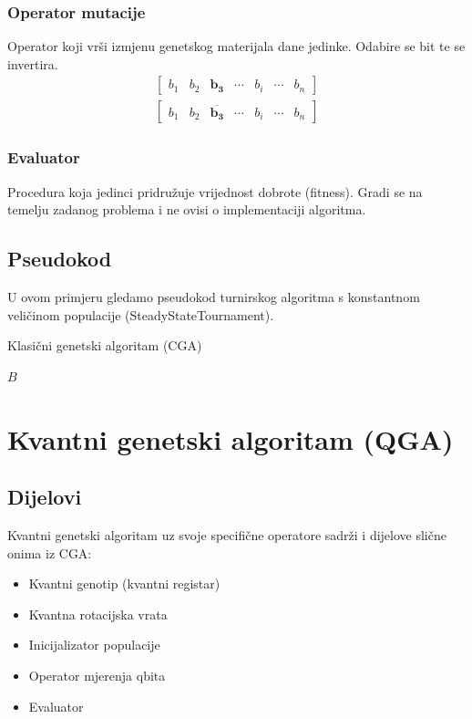 \documentclass[times, utf8, zavrsni]{fer}
\begin{document}
\subsubsection{Operator mutacije}
Operator koji vrši izmjenu genetskog materijala dane jedinke. Odabire se bit te se invertira.
\begin{align*}
\begin{bmatrix}
b_1 & b_2 & \mathbf{b_3} & \cdots & b_i & \cdots & b_n
\end{bmatrix}\\
\begin{bmatrix}
b_1 & b_2 & \overline{\mathbf{b_3}} & \cdots & b_i & \cdots & b_n
\end{bmatrix}
\end{align*}

\subsubsection{Evaluator}
Procedura koja jedinci pridružuje vrijednost dobrote (fitness). Gradi se na temelju zadanog problema i ne ovisi o implementaciji algoritma.


\subsection{Pseudokod}
U ovom primjeru gledamo pseudokod turnirskog algoritma s konstantnom veličinom populacije (SteadyStateTournament).
\begin{algorithm}
\caption{Klasični genetski algoritam (CGA)}
\label{algo:cga}
\begin{algorithmic}
\ENDWHILE
\RETURN $B$
\end{algorithmic}
\end{algorithm}

\section{Kvantni genetski algoritam (QGA)}
\subsection{Dijelovi}
Kvantni genetski algoritam uz svoje specifične operatore sadrži i dijelove slične onima iz CGA:
\begin{itemize}
\item Kvantni genotip (kvantni registar)
\item Kvantna rotacijska vrata
\item Inicijalizator populacije
\item Operator mjerenja qbita
\item Evaluator
\end{itemize}
\end{document}
